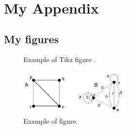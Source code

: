 \chapter{My Appendix}

\lipsum[2]

\section{My figures}

\begin{figure}[b!]
  \centering
  
  \caption{Example of Tikz figure \cite{NieChu}.}
  \label{fig:TikzFigure}
\end{figure}

\lipsum[2]

\begin{figure}[t!]
  \centering
  \includegraphics[width=0.5\textwidth]{Figures/GrafoDef.png}
  \caption{Example of figure.}
  \label{fig:}
\end{figure}
  
\lipsum[1]
